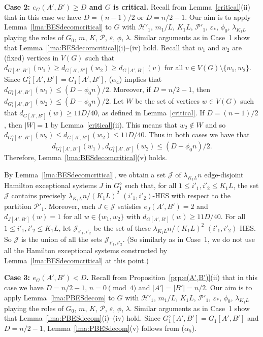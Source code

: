 \documentclass{memo-l}
\def\cP{\mathcal{P}}
\def\eps{\varepsilon}
\def\cJ{\mathcal{J}}
\numberwithin{section}{chapter}
\numberwithin{equation}{section}
\numberwithin{firstthm}{section}
\numberwithin{figure}{section}
\begin{document}
{\noindent\textbf{Case 2: $e_G(A',B') \ge D$ and $G$ is critical.}
Recall from Lemma~\ref{critical}(ii) that in this case we have $D = (n-1)/2$ or $D = n/2 -1$.
Our aim is to apply Lemma~\ref{lma:BESdecomcritical} to $G$ with $\mathcal{H}'_1$, $m_1/L$, $K_1L$, $\cP'_1$, $\eps_*$, $\phi_0$, $ \lambda_{K_1L}$
playing the roles of $G_0$, $m$, $K$, $\cP$, $\eps$, $\phi$, $\lambda$. Similar arguments as in Case~1 show that
Lemma~\ref{lma:BESdecomcritical}(i)--(iv) hold.
Recall that $w_1$ and $w_2$ are (fixed) vertices in $V(G)$ such that $d_{G[A',B']}(w_1) \ge d_{G[A',B']}(w_2) \ge d_{G[A',B']}(v)$
for all $v \in V(G) \setminus \{w_1,w_2\}$.
Since $G^{\diamond}_1[A',B'] = G_1[A',B']$, ($\alpha_4$) implies that $d_{G^{\diamond}_1[A',B']}(w_1) \le (D- \phi_0 n ) /2$.
Moreover, if $D = n/2 -1$, then $d_{G^{\diamond}_1[A',B']}(w_2) \le (D- \phi_0 n ) /2$.
Let $W$ be the set of vertices $w \in V(G)$ such that $d_{G[A',B']}(w) \ge 11D / 40$, as defined in Lemma~\ref{critical}.
If $D = (n-1)/2$, then $|W| = 1$ by Lemma~\ref{critical}(ii).
This means that $w_2 \notin W$ and so $d_{G^{\diamond}_1[A',B']}(w_2) \le d_{G[A',B']}(w_2) \le 11 D /40$.
Thus in both cases we have that
\begin{equation}\label{eq:degw1w2}
d_{G^{\diamond}_1[A',B']}(w_1), d_{G^{\diamond}_1[A',B']}(w_2) \le (D- \phi_0 n ) /2.
\end{equation}
Therefore, Lemma~\ref{lma:BESdecomcritical}(v) holds.

By Lemma~\ref{lma:BESdecomcritical}, we obtain a set $\cJ$ of $ \lambda_{K_1L} n$ edge-disjoint Hamilton exceptional systems
$J$ in $G_1^\diamond$ such that, for all $1 \le i'_1, i'_2  \le K_1L$, the set $\cJ$ contains precisely $\lambda_{K_1L} n/(K_1 L)^2$ $(i'_1,i'_2)$-HES
with respect to the partition $\cP'_1$. Moreover, each $J \in \cJ$ satisfies $e_J(A',B') =2 $ and $d_{J[A',B']}(w) =1 $ for all $w \in \{w_1,w_2\}$
with $d_{G[A',B']}(w) \ge 11D/40$. For all $1 \le i'_1, i'_2  \le K_1L$, let $\cJ_{i'_1 , i'_2}$ be the set of these
$\lambda_{K_1L} n/(K_1 L)^2$ $( i'_1, i'_2)$-HES. So $\cJ$ is the union of all the sets $\cJ_{ i'_1 , i'_2}$.
(So similarly as in Case~1, we do not use all the Hamilton exceptional systems constructed by Lemma~\ref{lma:BESdecomcritical} at this point.)


\noindent\textbf{Case 3: $e_G(A',B') < D$.}
Recall from Proposition~\ref{prp:e(A',B')}(ii) that in this case we have $D = n/2 - 1$, $n = 0 \pmod 4$ and $|A'| = |B'| = n/2$.
Our aim is to apply Lemma~\ref{lma:PBESdecom} to $G$ with $\mathcal{H}'_1$, $m_1/L$, $K_1L$, $\cP'_1$, $\eps_*$, $\phi_0$, $\lambda_{K_1L}$
playing the roles of $G_0$, $m$, $K$, $\cP$, $\eps$, $\phi$, $\lambda$. Similar arguments as in Case~1 show that
Lemma~\ref{lma:PBESdecom}(i)--(iv) hold.
Since $G^{\diamond}_1[A',B'] = G_1[A',B']$ and $D = n/2 -1$, Lemma~\ref{lma:PBESdecom}(v) follows from ($\alpha_5$).

}
\end{document}

